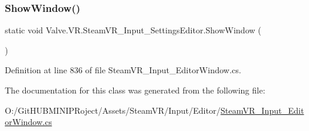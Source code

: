 \subsubsection{\texorpdfstring{ShowWindow()}{ShowWindow()}}
{\footnotesize\ttfamily static void Valve.\+V\+R.\+Steam\+V\+R\+\_\+\+Input\+\_\+\+Settings\+Editor.\+Show\+Window (\begin{DoxyParamCaption}{ }\end{DoxyParamCaption})\hspace{0.3cm}{\ttfamily [static]}}



Definition at line 836 of file Steam\+V\+R\+\_\+\+Input\+\_\+\+Editor\+Window.\+cs.



The documentation for this class was generated from the following file\+:\begin{DoxyCompactItemize}
\item 
O\+:/\+Git\+H\+U\+B\+M\+I\+N\+I\+P\+Roject/\+Assets/\+Steam\+V\+R/\+Input/\+Editor/\mbox{\hyperlink{_steam_v_r___input___editor_window_8cs}{Steam\+V\+R\+\_\+\+Input\+\_\+\+Editor\+Window.\+cs}}\end{DoxyCompactItemize}
